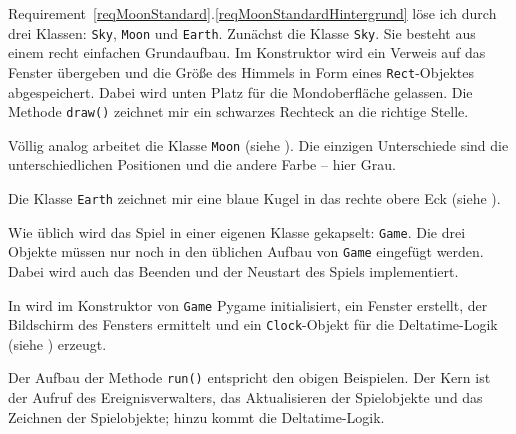 Requirement~\ref{reqMoonStandard}.\ref{reqMoonStandardHintergrund} löse ich durch drei Klassen: \texttt{Sky}, \texttt{Moon} und \texttt{Earth}. Zunächst die Klasse \texttt{Sky}. Sie besteht aus einem recht einfachen Grundaufbau. Im Konstruktor wird ein Verweis auf das Fenster übergeben und die Größe des Himmels in Form eines \texttt{Rect}-Objektes abgespeichert. Dabei wird unten Platz für die Mondoberfläche gelassen. Die Methode \texttt{draw()} zeichnet mir ein schwarzes Rechteck an die richtige Stelle. 



Völlig analog arbeitet die Klasse \texttt{Moon} (siehe ). Die einzigen Unterschiede sind die unterschiedlichen Positionen und die andere Farbe -- hier Grau. 



Die Klasse \texttt{Earth} zeichnet mir eine blaue Kugel in das rechte obere Eck (siehe ). 


Wie üblich wird das Spiel in einer eigenen Klasse gekapselt: \texttt{Game}. Die drei Objekte müssen nur noch in den üblichen Aufbau von \texttt{Game} eingefügt werden. Dabei wird auch das Beenden und der Neustart des Spiels implementiert. 

In  wird im Konstruktor von \texttt{Game} Pygame initialisiert, ein Fenster erstellt, der Bildschirm des Fensters ermittelt und ein \texttt{Clock}-Objekt für die Deltatime-Logik (siehe ) erzeugt. 


Der Aufbau der Methode \texttt{run()} entspricht den obigen Beispielen. Der Kern ist der Aufruf des Ereignisverwalters, das Aktualisieren der Spielobjekte und das Zeichnen der Spielobjekte; hinzu kommt die Deltatime-Logik.

